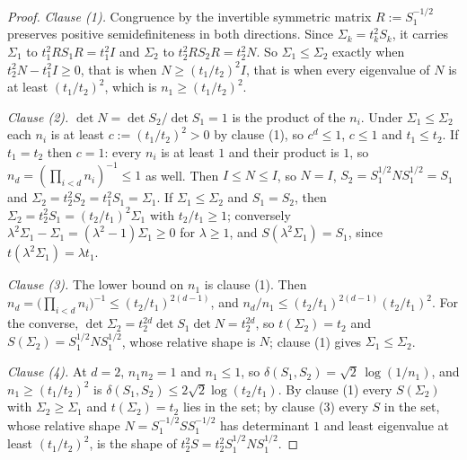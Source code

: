 \begin{proof}
\leanok
\emph{Clause (1).} Congruence by the invertible symmetric matrix $R := S_1^{-1/2}$ preserves positive
semidefiniteness in both directions. Since $\Sigma_k = t_k^2S_k$, it carries $\Sigma_1$ to
$t_1^2RS_1R = t_1^2I$ and $\Sigma_2$ to $t_2^2RS_2R = t_2^2N$. So $\Sigma_1 \le \Sigma_2$ exactly
when $t_2^2N - t_1^2I \ge 0$, that is when $N \ge (t_1/t_2)^2I$, that is when every eigenvalue of $N$
is at least $(t_1/t_2)^2$, which is $n_1 \ge (t_1/t_2)^2$.

\emph{Clause (2).} $\det N = \det S_2/\det S_1 = 1$ is the product of the $n_i$. Under
$\Sigma_1 \le \Sigma_2$ each $n_i$ is at least $c := (t_1/t_2)^2 > 0$ by clause (1), so $c^d \le 1$,
$c \le 1$ and $t_1 \le t_2$. If $t_1 = t_2$ then $c = 1$: every $n_i$ is at least $1$ and their
product is $1$, so $n_d = (\prod_{i<d}n_i)^{-1} \le 1$ as well. Then $I \le N \le I$, so $N = I$,
$S_2 = S_1^{1/2}NS_1^{1/2} = S_1$ and $\Sigma_2 = t_2^2S_2 = t_1^2S_1 = \Sigma_1$. If
$\Sigma_1 \le \Sigma_2$ and $S_1 = S_2$, then $\Sigma_2 = t_2^2S_1 = (t_2/t_1)^2\Sigma_1$ with
$t_2/t_1 \ge 1$; conversely $\lambda^2\Sigma_1 - \Sigma_1 = (\lambda^2 - 1)\Sigma_1 \ge 0$ for
$\lambda \ge 1$, and $S(\lambda^2\Sigma_1) = S_1$, since $t(\lambda^2\Sigma_1) = \lambda t_1$.

\emph{Clause (3).} The lower bound on $n_1$ is clause (1). Then
$n_d = \bigl(\prod_{i<d}n_i\bigr)^{-1} \le (t_2/t_1)^{2(d-1)}$, and
$n_d/n_1 \le (t_2/t_1)^{2(d-1)}(t_2/t_1)^2$. For the converse,
$\det\Sigma_2 = t_2^{2d}\det S_1\det N = t_2^{2d}$, so $t(\Sigma_2) = t_2$ and
$S(\Sigma_2) = S_1^{1/2}NS_1^{1/2}$, whose relative shape is $N$; clause (1) gives
$\Sigma_1 \le \Sigma_2$.

\emph{Clause (4).} At $d = 2$, $n_1n_2 = 1$ and $n_1 \le 1$, so
$\delta(S_1,S_2) = \sqrt2\,\log(1/n_1)$, and $n_1 \ge (t_1/t_2)^2$ is
$\delta(S_1,S_2) \le 2\sqrt2\log(t_2/t_1)$. By clause (1) every $S(\Sigma_2)$ with
$\Sigma_2 \ge \Sigma_1$ and $t(\Sigma_2) = t_2$ lies in the set; by clause (3) every $S$ in the set,
whose relative shape $N = S_1^{-1/2}SS_1^{-1/2}$ has determinant $1$ and least eigenvalue at least
$(t_1/t_2)^2$, is the shape of $t_2^2S = t_2^2S_1^{1/2}NS_1^{1/2}$.
\end{proof}
